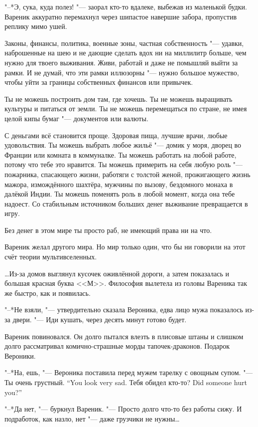 "--*Э, сука, куда полез! "--- заорал кто-то вдалеке, выбежав из маленькой будки.
Вареник аккуратно перемахнул через шипастое навершие забора, пропустив реплику мимо ушей.

Законы, финансы, политика, военные зоны, частная собственность "--- удавки, наброшенные на шею и не дающие сделать вдох ни на миллилитр больше, чем нужно для твоего выживания.
Живи, работай и даже не помышляй выйти за рамки.
И не думай, что эти рамки иллюзорны "--- нужно большое мужество, чтобы уйти за границы собственных финансов или привычек.

Ты не можешь построить дом там, где хочешь.
Ты не можешь выращивать культуры и питаться от земли.
Ты не можешь перемещаться по стране, не имея целой кипы бумаг "--- документов или валюты.

С деньгами всё становится проще.
Здоровая пища, лучшие врачи, любые удовольствия.
Ты можешь выбрать любое жильё "--- домик у моря, дворец во Франции или комната в коммуналке.
Ты можешь работать на любой работе, потому что тебе это нравится.
Ты можешь примерить на себя любую роль "--- пожарника, спасающего жизни, работяги с толстой женой, прожигающего жизнь мажора, измождённого шахтёра, мужчины по вызову, бездомного монаха в далёкой Индии.
Ты можешь поменять роль в любой момент, когда она тебе надоест.
Со стабильным источником больших денег выживание превращается в игру.

Без денег в этом мире ты просто раб, не имеющий права ни на что.

Вареник желал другого мира.
Но мир только один, что бы ни говорили на этот счёт теории мультивселенных.

\dots{}Из-за домов выглянул кусочек оживлённой дороги, а затем показалась и большая красная буква <<М>>.
Философия вылетела из головы Вареника так же быстро, как и появилась.

\asterism

"--*Не взяли, "--- утвердительно сказала Вероника, едва лицо мужа показалось из-за двери.
"--- Иди кушать, через десять минут готово будет.

Вареник повиновался.
Он долго пытался влезть в плисовые штаны и слишком долго рассматривал комично-страшные морды тапочек-драконов.
Подарок Вероники.

"--*На, ешь, "--- Вероника поставила перед мужем тарелку с овощным супом.
{"--- Ты очень грустный.}
{``You look very sad.}
{Тебя обидел кто-то?}
{Did someone hurt you?''}

"--*Да нет, "--- буркнул Вареник.
"--- Просто долго что-то без работы сижу.
И подработок, как назло, нет "--- даже грузчики не нужны\dots{}

